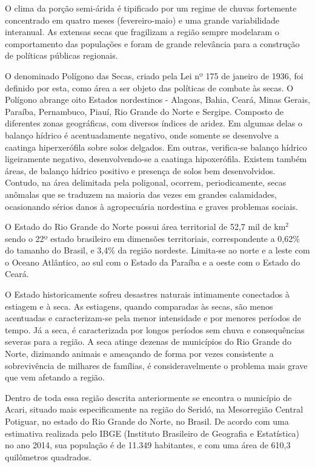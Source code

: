 O clima da porção semi-árida é tipificado por um regime de chuvas fortemente concentrado em quatro meses (fevereiro-maio) e
uma grande variabilidade interanual. As extensas secas que fragilizam a região sempre modelaram o comportamento das populações
e foram de grande relevância para a construção de políticas públicas regionais.

O denominado Polígono das Secas, criado pela Lei nº 175 de janeiro de 1936, foi definido por esta, como área a ser objeto das
políticas de combate às secas. O Polígono abrange oito Estados nordestinos - Alagoas, Bahia, Ceará, Minas Gerais, Paraíba, 
Pernambuco, Piauí, Rio Grande do Norte e Sergipe. Composto de diferentes zonas geográficas, com diversos índices de aridez.
Em algumas delas o balanço hídrico é acentuadamente negativo, onde somente se desenvolve a caatinga hiperxerófila sobre solos
delgados. Em outras, verifica-se balanço hídrico ligeiramente negativo, desenvolvendo-se a caatinga hipoxerófila. 
Existem também áreas, de balanço hídrico positivo e presença de solos bem desenvolvidos. Contudo, na área delimitada pela 
poligonal, ocorrem, periodicamente, secas anômalas que se traduzem na maioria das vezes em grandes calamidades, ocasionando 
sérios danos à agropecuária nordestina e graves problemas sociais.

O Estado do Rio Grande do Norte possui área territorial de 52,7 mil de km$^2$ sendo o 22º estado brasileiro em dimensões 
territoriais, correspondente a 0,62\% do tamanho do Brasil, e 3,4\% da região nordeste. 
Limita-se ao norte e a leste com o Oceano Atlântico, ao sul com o Estado da Paraíba e a oeste com o Estado do Ceará.

O Estado historicamente sofreu desastres naturais intimamente conectados à estiagem e à seca. 
As estiagens, quando comparadas às secas, são menos acentuadas e caracterizam-se pela menor intensidade e por menores
períodos de tempo. Já a seca, é caracterizada por longos períodos sem chuva e consequências severas para a região. 
A seca atinge dezenas de municípios do Rio Grande do Norte, dizimando animais e ameaçando de forma por vezes consistente 
a sobrevivência de milhares de famílias, é consideravelmente o problema mais grave que vem afetando a região.

Dentro de toda essa região descrita anteriormente se encontra o município de Acari, situado mais especificamente na 
região do Seridó, na Mesorregião Central Potiguar, no estado do Rio Grande do Norte, no Brasil. De acordo com uma estimativa
realizada pelo IBGE (Instituto Brasileiro de Geografia e Estatística) no ano 2014, sua população é de 11.349 habitantes, e
com uma área de 610,3 quilômetros quadrados.

